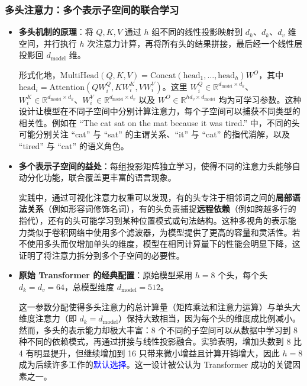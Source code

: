 \documentclass[11pt]{beamer}
\begin{document}
\begin{frame}
\frametitle{多头注意力：多个表示子空间的联合学习}
\begin{itemize}
  \item \textbf{多头机制的原理}：将 $Q,K,V$ 通过 $h$ 组不同的线性投影映射到 $d_k$、$d_k$、$d_v$ 维空间，并行执行 $h$ 次注意力计算，再将所有头的结果拼接，最后经一个线性层投影回 $d_{\text{model}}$ 维。\par
  形式化地，$\text{MultiHead}(Q,K,V)=\text{Concat}(\text{head}_1,\dots,\text{head}_h)W^O$，其中 $\text{head}_i=\text{Attention}(QW_i^Q, KW_i^K, VW_i^V)$。这里 $W_i^Q\in\mathbb{R}^{d_{\text{model}}\times d_k}$、$W_i^K\in\mathbb{R}^{d_{\text{model}}\times d_k}$、$W_i^V\in\mathbb{R}^{d_{\text{model}}\times d_v}$ 以及 $W^O\in\mathbb{R}^{h d_v\times d_{\text{model}}}$ 均为可学习参数。这种设计让模型在不同子空间中分别计算注意力，每个子空间可以捕获不同类型的相关性。例如在 “The cat sat on the mat because it was tired.” 中，不同的头可能分别关注 “cat” 与 “sat” 的主谓关系、“it” 与 “cat” 的指代消解，以及 “tired” 与 “cat” 的语义角色。

  \item \textbf{多个表示子空间的益处}：每组投影矩阵独立学习，使得不同的注意力头能够自动分化功能，联合覆盖更丰富的语言现象。\par
  实践中，通过可视化注意力权重可以发现，有的头专注于相邻词之间的\textbf{局部语法关系}（例如形容词修饰名词），有的头负责捕捉\textbf{远程依赖}（例如跨越多行的指代），还有的头可能学习到某种位置模式或句法结构。这种多视角的表示能力类似于卷积网络中使用多个滤波器，为模型提供了更高的容量和灵活性。若不使用多头而仅增加单头的维度，模型在相同计算量下的性能会明显下降，这证明了将注意力拆分到多个子空间的必要性。

  \item \textbf{原始 Transformer 的经典配置}：原始模型采用 $h=8$ 个头，每个头 $d_k=d_v=64$，总模型维度 $d_{\text{model}}=512$。\par
  这一参数分配使得多头注意力的总计算量（矩阵乘法和注意力运算）与单头大维度注意力（即 $d_k=d_{\text{model}}$）保持大致相当，因为每个头的维度成比例减小。然而，多头的表示能力却极大丰富：8 个不同的子空间可以从数据中学习到 8 种不同的依赖模式，再通过拼接与线性投影融合。实验表明，增加头数到 8 比 4 有明显提升，但继续增加到 16 只带来微小增益且计算开销增大，因此 $h=8$ 成为后续许多工作的\textcolor{blue}{默认选择}。这一设计被公认为 Transformer 成功的关键因素之一。
\end{itemize}
\end{frame}
\end{document}
